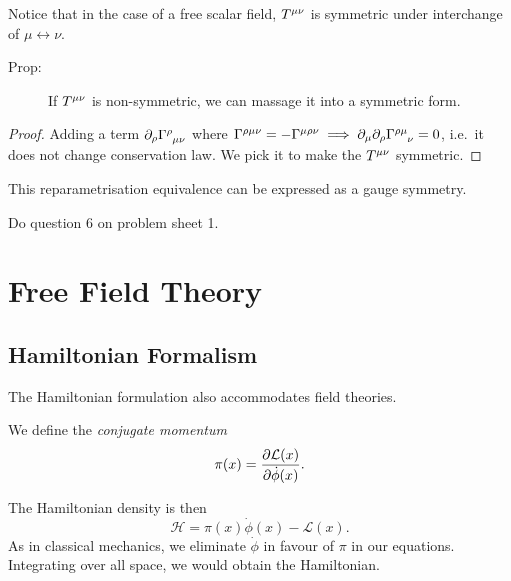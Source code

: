 Notice that in the case of a free scalar field, $T \indices{^\mu^\nu}$ is symmetric under interchange of $\mu \leftrightarrow \nu$.

\begin{description}
  \item[Prop:] If $T \indices{^\mu^\nu}$ is non-symmetric, we can massage it into a symmetric form.
\end{description}
\begin{proof}
  Adding a term $\partial_\rho \Gamma\indices{^\rho_\mu_\nu}$ where $\Gamma\indices{^\rho^\mu^\nu} = -\Gamma\indices{^\mu^\rho^\nu} \implies \partial_\mu \partial_\rho \Gamma \indices{^\rho^\mu_\nu} = 0$, i.e.~it does not change conservation law. We pick it to make the $T \indices{^\mu^\nu}$ symmetric.
\end{proof}
\begin{leftbar}
  \begin{remark}
    This reparametrisation equivalence can be expressed as a gauge symmetry.
  \end{remark}
\end{leftbar}

\begin{exercise}
Do question 6 on problem sheet 1.
\end{exercise}

\chapter{Free Field Theory}%
\label{cha:free_field_theory}

\section{Hamiltonian Formalism}%
\label{sec:hamiltonian_formalism}

The Hamiltonian formulation also accommodates field theories.
\begin{definition}
  We define the \emph{conjugate momentum}
  \begin{equation}
    \pi(x) = \pdv{\mathcal{L}(x)}{\dot \phi(x)}.
  \end{equation}
\end{definition}
The Hamiltonian density is then
\begin{equation}
  \mathcal{H} = \pi(x) \dot \phi(x) - \mathcal{L}(x).
\end{equation}
As in classical mechanics, we eliminate $\dot \phi$ in favour of $\pi$ in our equations.
Integrating over all space, we would obtain the Hamiltonian.

